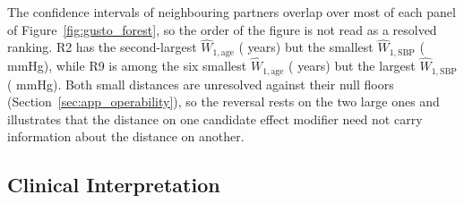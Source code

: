 \documentclass[AMA,Times1COL]{WileyNJDv5}
\begin{document}
The confidence intervals of neighbouring partners overlap over most of each panel of Figure~\ref{fig:gusto_forest}, so the order of the figure is not read as a resolved ranking.
R2 has the second-largest $\widehat{W}_{1,\text{age}}$ ( years) but the smallest $\widehat{W}_{1,\text{SBP}}$ ( mmHg), while R9 is among the six smallest $\widehat{W}_{1,\text{age}}$ ( years) but the largest $\widehat{W}_{1,\text{SBP}}$ ( mmHg). Both small distances are unresolved against their null floors (Section~\ref{sec:app_operability}), so the reversal rests on the two large ones and illustrates that the distance on one candidate effect modifier need not carry information about the distance on another.

\subsection{Clinical Interpretation}\label{sec:app_clinical}
\end{document}
